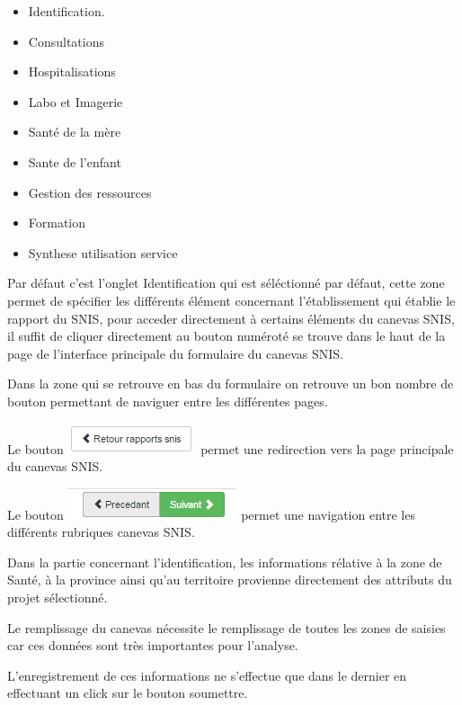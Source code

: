\documentclass[12pt,a4paper]{report}
\begin{document}
\begin{itemize}
\item Identification. %
\item Consultations
\item Hospitalisations
\item Labo et Imagerie
\item Santé de la mère
\item Sante de l'enfant
\item Gestion des ressources
\item Formation
\item  Synthese utilisation service
\end{itemize}

Par défaut c'est l'onglet Identification qui est séléctionné par défaut, cette zone permet de spécifier les différents élément concernant l'établissement qui établie le rapport du SNIS, pour acceder directement à certains éléments du canevas SNIS, il suffit de cliquer directement au bouton numéroté se trouve dans le haut de la page de l'interface principale du formulaire du canevas SNIS.

Dans la zone qui se retrouve en bas du formulaire on retrouve un bon nombre de bouton permettant de naviguer entre les différentes pages.

Le bouton \includegraphics[scale=1]{pic/ReSnisB.png} permet une redirection vers la page principale du canevas SNIS.

Le bouton \includegraphics[scale=1]{pic/SnisPrecSuiv.png} permet une navigation entre les différents rubriques  canevas SNIS.

Dans la partie concernant l'identification, les informations rélative à la zone de Santé, à la province ainsi qu'au territoire provienne directement des attributs du projet sélectionné. 

Le remplissage du canevas nécessite le remplissage de toutes les zones de saisies car ces données sont très importantes pour l'analyse.

L'enregistrement de ces informations ne s'effectue que dans le dernier en effectuant un click sur le bouton soumettre.
\end{document}
